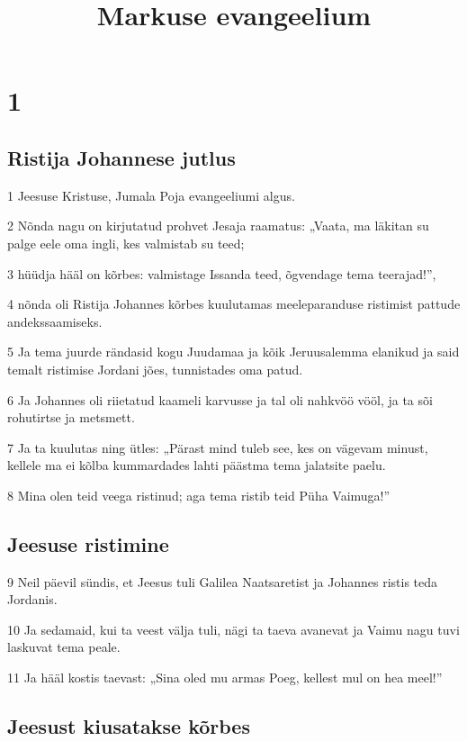 

\title{Markuse evangeelium}

\chapter{1}

\section*{Ristija Johannese jutlus}

\par 1 Jeesuse Kristuse, Jumala Poja evangeeliumi algus.
\par 2 Nõnda nagu on kirjutatud prohvet Jesaja raamatus: „Vaata, ma läkitan su palge eele oma ingli, kes valmistab su teed;
\par 3 hüüdja hääl on kõrbes: valmistage Issanda teed, õgvendage tema teerajad!”,
\par 4 nõnda oli Ristija Johannes kõrbes kuulutamas meeleparanduse ristimist pattude andekssaamiseks.
\par 5 Ja tema juurde rändasid kogu Juudamaa ja kõik Jeruusalemma elanikud ja said temalt ristimise Jordani jões, tunnistades oma patud.
\par 6 Ja Johannes oli riietatud kaameli karvusse ja tal oli nahkvöö vööl, ja ta sõi rohutirtse ja metsmett.
\par 7 Ja ta kuulutas ning ütles: „Pärast mind tuleb see, kes on vägevam minust, kellele ma ei kõlba kummardades lahti päästma tema jalatsite paelu.
\par 8 Mina olen teid veega ristinud; aga tema ristib teid Püha Vaimuga!”

\section*{Jeesuse ristimine}

\par 9 Neil päevil sündis, et Jeesus tuli Galilea Naatsaretist ja Johannes ristis teda Jordanis.
\par 10 Ja sedamaid, kui ta veest välja tuli, nägi ta taeva avanevat ja Vaimu nagu tuvi laskuvat tema peale.
\par 11 Ja hääl kostis taevast: „Sina oled mu armas Poeg, kellest mul on hea meel!”

\section*{Jeesust kiusatakse kõrbes}

